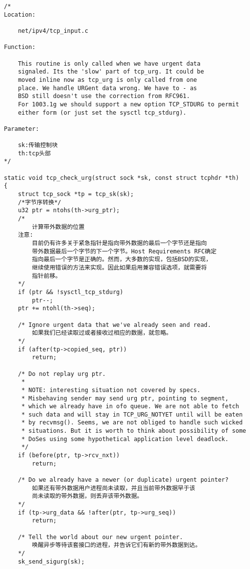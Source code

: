 \begin{verbatim}
/*
Location:

    net/ipv4/tcp_input.c

Function:

    This routine is only called when we have urgent data
    signaled. Its the 'slow' part of tcp_urg. It could be
    moved inline now as tcp_urg is only called from one
    place. We handle URGent data wrong. We have to - as
    BSD still doesn't use the correction from RFC961.
    For 1003.1g we should support a new option TCP_STDURG to permit
    either form (or just set the sysctl tcp_stdurg).

Parameter:

    sk:传输控制块
    th:tcp头部
*/

static void tcp_check_urg(struct sock *sk, const struct tcphdr *th)
{
    struct tcp_sock *tp = tcp_sk(sk);
    /*字节序转换*/
    u32 ptr = ntohs(th->urg_ptr);
    /*
        计算带外数据的位置
    注意:
        目前仍有许多关于紧急指针是指向带外数据的最后一个字节还是指向
        带外数据最后一个字节的下一个字节。Host Requirements RFC确定
        指向最后一个字节是正确的。然而，大多数的实现，包括BSD的实现，
        继续使用错误的方法来实现。因此如果启用兼容错误选项，就需要将
        指针前移。
    */
    if (ptr && !sysctl_tcp_stdurg)
        ptr--;
    ptr += ntohl(th->seq);

    /* Ignore urgent data that we've already seen and read. 
        如果我们已经读取过或者接收过相应的数据，就忽略。
    */
    if (after(tp->copied_seq, ptr))
        return;

    /* Do not replay urg ptr.
     *
     * NOTE: interesting situation not covered by specs.
     * Misbehaving sender may send urg ptr, pointing to segment,
     * which we already have in ofo queue. We are not able to fetch
     * such data and will stay in TCP_URG_NOTYET until will be eaten
     * by recvmsg(). Seems, we are not obliged to handle such wicked
     * situations. But it is worth to think about possibility of some
     * DoSes using some hypothetical application level deadlock.
     */
    if (before(ptr, tp->rcv_nxt))
        return;

    /* Do we already have a newer (or duplicate) urgent pointer? 
        如果还有带外数据用户进程尚未读取，并且当前带外数据早于该
        尚未读取的带外数据，则丢弃该带外数据。
    */
    if (tp->urg_data && !after(ptr, tp->urg_seq))
        return;

    /* Tell the world about our new urgent pointer. 
        唤醒异步等待该套接口的进程，并告诉它们有新的带外数据到达。
    */
    sk_send_sigurg(sk);


\end{verbatim}
